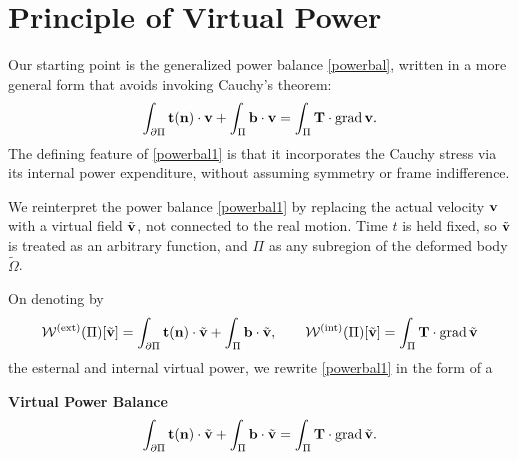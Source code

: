 \section{Principle of Virtual Power}
Our starting point is the generalized power balance \eqref{powerbal}, written in a more general form that avoids invoking Cauchy’s theorem:
\begin{equation}\label{powerbal1}
\int_{\partial \Pi}\mathbf{t}(\mathbf{n})\cdot \mathbf{v}+\int_\Pi \mathbf{b}\cdot\mathbf{v}=\int_\Pi \mathbf{T} \cdot \operatorname{grad} \mathbf{v}.
\end{equation}
The defining feature of \eqref{powerbal1} is that it incorporates the Cauchy stress via its internal power expenditure, without assuming symmetry or frame indifference.

We reinterpret the power balance  \eqref{powerbal1} by replacing the actual velocity $\mathbf{v}$ with a virtual field $\tilde{\mathbf{v}}$, not connected to the real motion. Time $t$ is held fixed, so $\tilde{\mathbf{v}}$  is treated as an arbitrary function, and $\Pi$ as any subregion of the deformed body $\widetilde{\Omega}$.

On denoting by
\begin{equation}
\mathcal{W}^{\rm (ext)}(\Pi)[\tilde{\mathbf{v}}]=\int_{\partial \Pi}\mathbf{t}(\mathbf{n})\cdot \tilde{\mathbf{v}}+\int_\Pi \mathbf{b}\cdot\tilde{\mathbf{v}}, \qquad \mathcal{W}^{\rm (int)}(\Pi)[\tilde{\mathbf{v}}]=\int_\Pi \mathbf{T} \cdot \operatorname{grad} \tilde{\mathbf{v}}
\end{equation}
the esternal and internal virtual power, we rewrite  \eqref{powerbal1} in the form of a 
\begin{definition}
\textbf{Virtual Power Balance}
\begin{equation}\label{VPB}
\int_{\partial \Pi}\mathbf{t}(\mathbf{n})\cdot \tilde{\mathbf{v}}+\int_\Pi \mathbf{b}\cdot\tilde{\mathbf{v}}=\int_\Pi \mathbf{T} \cdot \operatorname{grad} \tilde{\mathbf{v}}.
\end{equation}
\end{definition}

